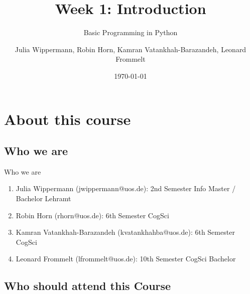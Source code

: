 
\usepackage{gensymb}
\usepackage{csquotes}
\usepackage{fontawesome}

\nocite{*}




\title[Introduction]{Week 1: Introduction}
\subtitle{Basic Programming in Python}

\author[jwippermann, rhorn, kvatankhahba, lfrommelt]{Julia Wippermann, Robin Horn, Kamran Vatankhah-Barazandeh, Leonard Frommelt}

\date{\today}

\begin{frame}[plain]
    \titlepage
\end{frame}

\begin{frame}
    \tableofcontents
\end{frame}

\section{About this course}

\subsection{Who we are}

\begin{frame}{Who we are}

    \begin{enumerate}
        \item Julia Wippermann (jwippermann@uos.de):
        \newline 2nd Semester Info Master / Bachelor Lehramt
        \newline
        \item Robin Horn (rhorn@uos.de):
        \newline 6th Semester CogSci
        \item Kamran Vatankhah-Barazandeh (kvatankhahba@uos.de):
        \newline 6th Semester CogSci
        \newline
        \item Leonard Frommelt (lfrommelt@uos.de):
        \newline 10th Semester CogSci Bachelor
    \end{enumerate}
\end{frame}

\subsection{Who should attend this Course}

